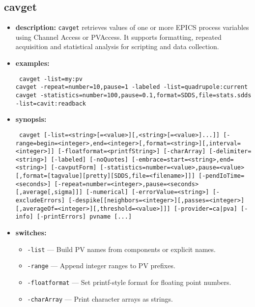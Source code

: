 %
%
\begin{latexonly}
\newpage
\end{latexonly}

\subsection{cavget}
\label{cavget}

\begin{itemize}
\item {\bf description:}
\verb+cavget+ retrieves values of one or more EPICS process variables using Channel Access or PVAccess.
It supports formatting, repeated acquisition and statistical analysis for scripting and data collection.
\item {\bf examples:}
\begin{flushleft}{\tt
cavget -list=my:pv\\
cavget -repeat=number=10,pause=1 -labeled -list=quadrupole:current\\
cavget -statistics=number=100,pause=0.1,format=SDDS,file=stats.sdds -list=cavit:readback
}\end{flushleft}
\item {\bf synopsis:}
\begin{flushleft}{\tt
cavget [-list=<string>[=<value>][,<string>[=<value>]...]]\
[-range=begin=<integer>,end=<integer>[,format=<string>][,interval=<integer>]]\
[-floatformat=<printfString>] [-charArray] [-delimiter=<string>] [-labeled]\
[-noQuotes] [-embrace=start=<string>,end=<string>] [-cavputForm]\
[-statistics=number=<value>,pause=<value>[,format=[tagvalue][pretty][SDDS,file=<filename>]]]\
[-pendIoTime=<seconds>] [-repeat=number=<integer>,pause=<seconds>[,average[,sigma]]]\
[-numerical] [-errorValue=<string>] [-excludeErrors]\
[-despike[[neighbors=<integer>][,passes=<integer>][,averageOf=<integer>][,threshold=<value>]]]\
[-provider={ca|pva}] [-info] [-printErrors] pvname [...]
}\end{flushleft}
\item {\bf switches:}
  \begin{itemize}
    \item {\tt -list} --- Build PV names from components or explicit names.
    \item {\tt -range} --- Append integer ranges to PV prefixes.
    \item {\tt -floatformat} --- Set printf-style format for floating point numbers.
    \item {\tt -charArray} --- Print character arrays as strings.

\end{itemize}
\end{itemize}
